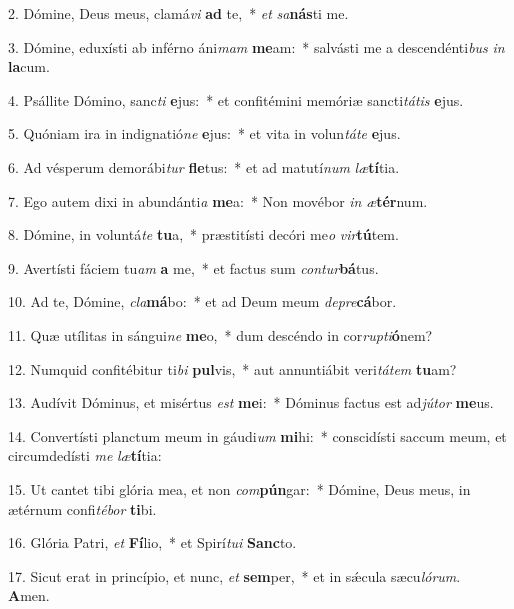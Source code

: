 2. Dómine, Deus meus, clamá\textit{vi} \textbf{ad} te,~*  \textit{et} \textit{sa}\textbf{nás}ti me.\

3. Dómine, eduxísti ab inférno áni\textit{mam} \textbf{me}am:~*  salvásti me a descendénti\textit{bus} \textit{in} \textbf{la}cum.\

4. Psállite Dómino, sanc\textit{ti} \textbf{e}jus:~*  et confitémini memóriæ sancti\textit{tá}\textit{tis} \textbf{e}jus.\

5. Quóniam ira in indignatió\textit{ne} \textbf{e}jus:~*  et vita in volun\textit{tá}\textit{te} \textbf{e}jus.\

6. Ad vésperum demorábi\textit{tur} \textbf{fle}tus:~*  et ad matutí\textit{num} \textit{læ}\textbf{tí}tia.\

7. Ego autem dixi in abundánti\textit{a} \textbf{me}a:~*  Non movébor \textit{in} \textit{æ}\textbf{tér}num.\

8. Dómine, in voluntá\textit{te} \textbf{tu}a,~*  præstitísti decóri me\textit{o} \textit{vir}\textbf{tú}tem.\

9. Avertísti fáciem tu\textit{am} \textbf{a} me,~*  et factus sum \textit{con}\textit{tur}\textbf{bá}tus.\

10. Ad te, Dómine, \textit{cla}\textbf{má}bo:~*  et ad Deum meum \textit{de}\textit{pre}\textbf{cá}bor.\

11. Quæ utílitas in sángui\textit{ne} \textbf{me}o,~*  dum descéndo in cor\textit{rup}\textit{ti}\textbf{ó}nem?\

12. Numquid confitébitur ti\textit{bi} \textbf{pul}vis,~*  aut annuntiábit veri\textit{tá}\textit{tem} \textbf{tu}am?\

13. Audívit Dóminus, et misértus \textit{est} \textbf{me}i:~*  Dóminus factus est ad\textit{jú}\textit{tor} \textbf{me}us.\

14. Convertísti planctum meum in gáudi\textit{um} \textbf{mi}hi:~*  conscidísti saccum meum, et circumdedísti \textit{me} \textit{læ}\textbf{tí}tia:\

15. Ut cantet tibi glória mea, et non \textit{com}\textbf{pún}gar:~*  Dómine, Deus meus, in ætérnum confi\textit{té}\textit{bor} \textbf{ti}bi.\

16. Glória Patri, \textit{et} \textbf{Fí}lio,~*  et Spirí\textit{tu}\textit{i} \textbf{Sanc}to.\

17. Sicut erat in princípio, et nunc, \textit{et} \textbf{sem}per,~*  et in sǽcula sæcu\textit{ló}\textit{rum}. \textbf{A}men.\

